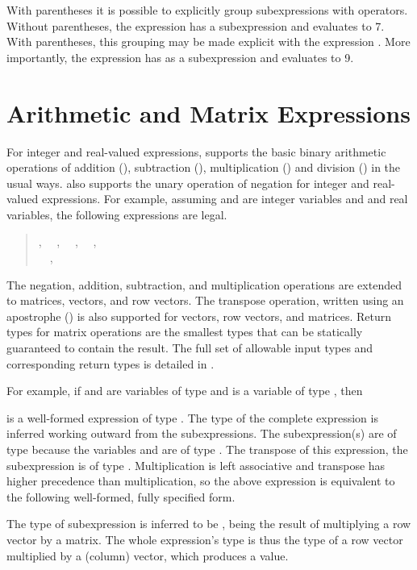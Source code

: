 With parentheses it is possible to explicitly group subexpressions
with operators.  Without parentheses, the expression 
has a subexpression  and evaluates to 7.  With
parentheses, this grouping may be made explicit with the expression
.  More importantly, the expression  has  as a subexpression and evaluates to 9.


\section{Arithmetic and Matrix Expressions}

For integer and real-valued expressions, \Stan supports the basic
binary arithmetic operations of addition (\code{+}), subtraction
(\code{-}), multiplication (\code{*}) and division (\code{/}) in the
usual ways.  \Stan also supports the unary operation of negation for
integer and real-valued expressions.  For example, assuming 
and  are integer variables and  and  real
variables, the following expressions are legal.
\begin{quote}
, 
\ \ ,
\ \ , 
\ \ ,
\\
\ \ ,
\ \ 
\end{quote}
%
The negation, addition, subtraction, and multiplication operations are
extended to matrices, vectors, and row vectors.  The transpose
operation, written using an apostrophe () is also supported
for vectors, row vectors, and matrices.  Return types for matrix
operations are the smallest types that can be statically guaranteed to
contain the result.  The full set of allowable input types and
corresponding return types is detailed in
.

For example, if  and  are variables of type
 and  is a variable of type ,
then
%
\begin{quote}
\end{quote}
%
is a well-formed expression of type .  The type of the
complete expression is inferred working outward from the
subexpressions.  The subexpression(s)  are of type
 because the variables  and  are of type
.  The transpose of this expression, the subexpression
 is of type .  Multiplication is
left associative and transpose has higher precedence than
multiplication, so the above expression is equivalent to the following
well-formed, fully specified form.
%
\begin{quote}
\end{quote}
%
The type of subexpression  is inferred to be
, being the result of multiplying a row vector by a
matrix.  The whole expression's type is thus the type of a row vector
multiplied by a (column) vector, which produces a  value.



